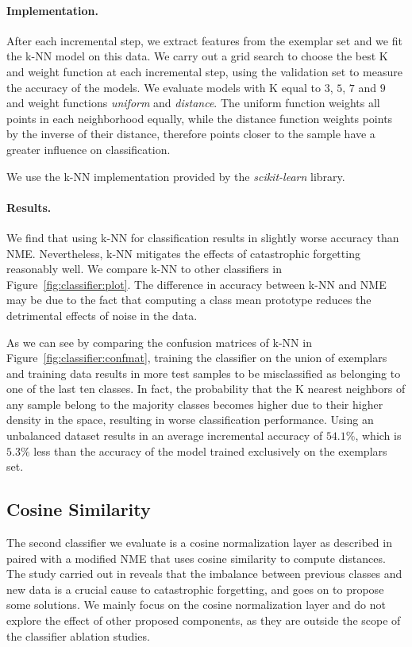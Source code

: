 \documentclass[10pt,twocolumn,letterpaper]{article}
\begin{document}
\paragraph{Implementation.} After each incremental step, we extract features from the exemplar set and we fit the k-NN model on this data. We carry out a grid search to choose the best K and weight function at each incremental step, using the validation set to measure the accuracy of the models. We evaluate models with K equal to $3$, $5$, $7$ and $9$ and weight functions \emph{uniform} and \emph{distance}. The uniform function weights all points in each neighborhood equally, while the distance function weights points by the inverse of their distance, therefore points closer to the sample have a greater influence on classification.

We use the k-NN implementation provided by the \emph{scikit-learn} library.

\paragraph{Results.} We find that using k-NN for classification results in slightly worse accuracy than NME. Nevertheless, k-NN mitigates the effects of catastrophic forgetting reasonably well. We compare k-NN to other classifiers in Figure~\ref{fig:classifier:plot}. The difference in accuracy between k-NN and NME may be due to the fact that computing a class mean prototype reduces the detrimental effects of noise in the data.

As we can see by comparing the confusion matrices of k-NN in Figure~\ref{fig:classifier:confmat}, training the classifier on the union of exemplars and training data results in more test samples to be misclassified as belonging to one of the last ten classes. In fact, the probability that the K nearest neighbors of any sample belong to the majority classes becomes higher due to their higher density in the space, resulting in worse classification performance. Using an unbalanced dataset results in an average incremental accuracy of $54.1\%$, which is $5.3\%$ less than the accuracy of the model trained exclusively on the exemplars set.

\subsection{Cosine Similarity}
The second classifier we evaluate is a cosine normalization layer as described in \cite{hou:2019} paired with a modified NME that uses cosine similarity to compute distances. The study carried out in \cite{hou:2019} reveals that the imbalance between previous classes and new data is a crucial cause to catastrophic forgetting, and goes on to propose some solutions. We mainly focus on the cosine normalization layer and do not explore the effect of other proposed components, as they are outside the scope of the classifier ablation studies.
\end{document}
